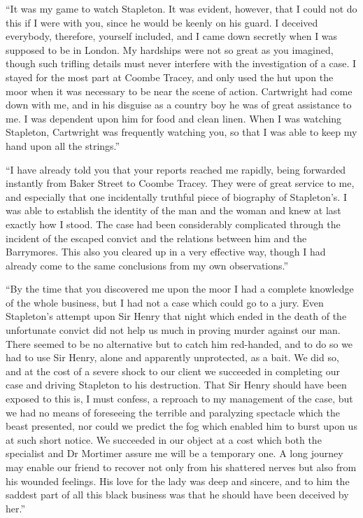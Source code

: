 \documentclass[paper=a5,BCOR=7mm,twoside,DIV=calc,12pt,usegeometry,openany,chapterprefix,endperiod,headings=big]{scrbook} %
\begin{document}
\enquote{It was my game to watch Stapleton. It was evident, however, that I could not do this if I were with you, since he would be keenly on his guard. I deceived everybody, therefore, yourself included, and I came down secretly when I was supposed to be in London. My hardships were not so great as you imagined, though such trifling details must never interfere with the investigation of a case. I stayed for the most part at Coombe Tracey, and only used the hut upon the moor when it was necessary to be near the scene of action. Cartwright had come down with me, and in his disguise as a country boy he was of great assistance to me. I was dependent upon him for food and clean linen. When I was watching Stapleton, Cartwright was frequently watching you, so that I was able to keep my hand upon all the strings.}

\enquote{I have already told you that your reports reached me rapidly, being forwarded instantly from Baker Street to Coombe Tracey. They were of great service to me, and especially that one incidentally truthful piece of biography of Stapleton's. I was able to establish the identity of the man and the woman and knew at last exactly how I stood. The case had been considerably complicated through the incident of the escaped convict and the relations between him and the Barrymores. This also you cleared up in a very effective way, though I had already come to the same conclusions from my own observations.}

\enquote{By the time that you discovered me upon the moor I had a complete knowledge of the whole business, but I had not a case which could go to a jury. Even Stapleton's attempt upon Sir Henry that night which ended in the death of the unfortunate convict did not help us much in proving murder against our man. There seemed to be no alternative but to catch him red-handed, and to do so we had to use Sir Henry, alone and apparently unprotected, as a bait. We did so, and at the cost of a severe shock to our client we succeeded in completing our case and driving Stapleton to his destruction. That Sir Henry should have been exposed to this is, I must confess, a reproach to my management of the case, but we had no means of foreseeing the terrible and paralyzing spectacle which the beast presented, nor could we predict the fog which enabled him to burst upon us at such short notice. We succeeded in our object at a cost which both the specialist and Dr Mortimer assure me will be a temporary one. A long journey may enable our friend to recover not only from his shattered nerves but also from his wounded feelings. His love for the lady was deep and sincere, and to him the saddest part of all this black business was that he should have been deceived by her.}
\end{document}
